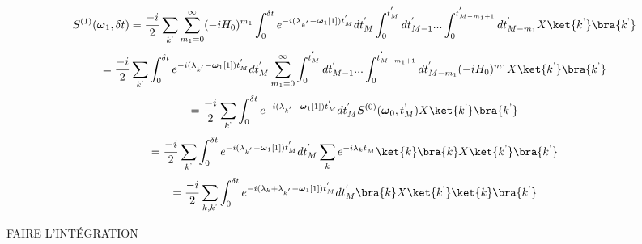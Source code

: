 \begin{equation*}
    S^{(1)}(\boldsymbol{\omega}_1, \delta t) = \frac{-i}{2}\sum_{k^\text{'}}\sum_{m_1 = 0}^{\infty}(-iH_0)^{m_1}\int_{0}^{\delta t}e^{-i(\lambda_{k^{'}}-\boldsymbol{\omega}_1[1])t^{'}_{M}}dt^{'}_M \int_{0}^{t^{'}_M}dt^{'}_{M-1}... \int_{0}^{t^{'}_{M-m_1+1}} dt_{M-m_1}^{'}X\ket{k^\text{'}}\bra{k^\text{'}}
\end{equation*}
\begin{equation*}
    = \frac{-i}{2}\sum_{k^\text{'}}\int_{0}^{\delta t}e^{-i(\lambda_{k^{'}}-\boldsymbol{\omega}_1[1])t^{'}_{M}}dt^{'}_M\sum_{m_1 = 0}^{\infty}\int_{0}^{t^{'}_M}dt^{'}_{M-1}... \int_{0}^{t^{'}_{M-m_1+1}} dt_{M-m_1}^{'}(-iH_0)^{m_1}X\ket{k^\text{'}}\bra{k^\text{'}}
\end{equation*}
\begin{equation*}
    = \frac{-i}{2}\sum_{k^\text{'}}\int_{0}^{\delta t}e^{-i(\lambda_{k^{'}}-\boldsymbol{\omega}_1[1])t^{'}_{M}}dt^{'}_M S^{(0)}(\boldsymbol{\omega}_0, t^\text{'}_M) X\ket{k^\text{'}}\bra{k^\text{'}} 
\end{equation*}
\begin{equation*}
    = \frac{-i}{2}\sum_{k^\text{'}}\int_{0}^{\delta t}e^{-i(\lambda_{k^{'}}-\boldsymbol{\omega}_1[1])t^{'}_{M}}dt^{'}_M \sum_{k}e^{-i\lambda_k t^\text{'}_M}\ket{k}\bra{k} X\ket{k^\text{'}}\bra{k^\text{'}}
\end{equation*}
\begin{equation*}
    = \frac{-i}{2}\sum_{k,k^\text{'}}\int_{0}^{\delta t}e^{-i(\lambda_k + \lambda_{k^{'}}-\boldsymbol{\omega}_1[1])t^{'}_{M}}dt^{'}_M \bra{k} X\ket{k^\text{'}} \ket{k}\bra{k^\text{'}}
\end{equation*}

FAIRE L'INTÉGRATION













